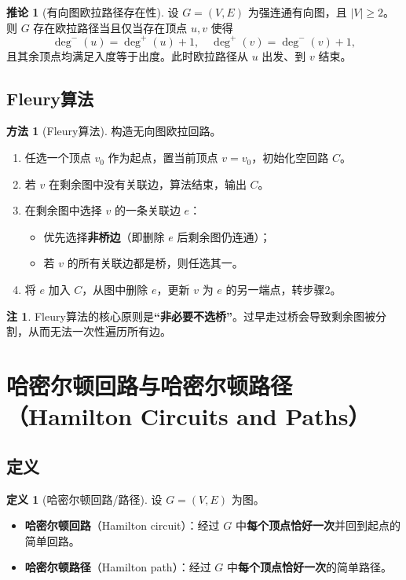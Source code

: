 \documentclass[UTF8,11pt,a4paper]{ctexbook}   %
\theoremstyle{definition}
\newtheorem{definition}{定义}[section]
\newtheorem{remark}{注}[section]
\newtheorem{method}{方法}[section]
\newtheorem{corollary}{推论}[section]
\begin{document}
\begin{corollary}[有向图欧拉路径存在性]
设 $G=(V,E)$ 为强连通有向图，且 $|V|\ge 2$。则 $G$ 存在欧拉路径当且仅当存在顶点 $u,v$ 使得
\[
\deg^-(u)=\deg^+(u)+1,\quad \deg^+(v)=\deg^-(v)+1,
\]
且其余顶点均满足入度等于出度。此时欧拉路径从 $u$ 出发、到 $v$ 结束。
\end{corollary}

\subsection{Fleury算法}

\begin{method}[Fleury算法]
构造无向图欧拉回路。
\begin{enumerate}
    \item 任选一个顶点 $v_0$ 作为起点，置当前顶点 $v=v_0$，初始化空回路 $C$。
    \item 若 $v$ 在剩余图中没有关联边，算法结束，输出 $C$。
    \item 在剩余图中选择 $v$ 的一条关联边 $e$：
    \begin{itemize}
        \item 优先选择\textbf{非桥边}（即删除 $e$ 后剩余图仍连通）；
        \item 若 $v$ 的所有关联边都是桥，则任选其一。
    \end{itemize}
    \item 将 $e$ 加入 $C$，从图中删除 $e$，更新 $v$ 为 $e$ 的另一端点，转步骤2。
\end{enumerate}
\end{method}

\begin{remark}
Fleury算法的核心原则是\textbf{“非必要不选桥”}。过早走过桥会导致剩余图被分割，从而无法一次性遍历所有边。
\end{remark}

\section{哈密尔顿回路与哈密尔顿路径（Hamilton Circuits and Paths）}

\subsection{定义}

\begin{definition}[哈密尔顿回路/路径]
设 $G=(V,E)$ 为图。
\begin{itemize}
    \item \textbf{哈密尔顿回路}（Hamilton circuit）：经过 $G$ 中\textbf{每个顶点恰好一次}并回到起点的简单回路。
    \item \textbf{哈密尔顿路径}（Hamilton path）：经过 $G$ 中\textbf{每个顶点恰好一次}的简单路径。
\end{itemize}
\end{definition}
\end{document}
